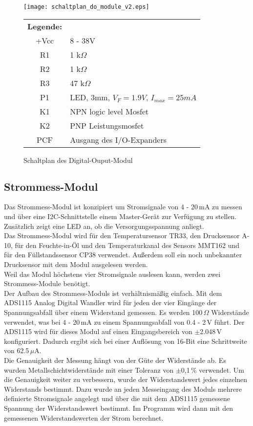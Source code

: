 \begin{figure}[h]
\centering
\texttt{[image: schaltplan\_do\_module\_v2.eps]}
\caption{Schaltplan des Digital-Ouput-Modul}
\vspace{12pt}
\begin{tabular}{c l}
	\textbf{Legende:}\\
	+Vcc & 8 - 38V\\
	R1 & 1 k\(\Omega\)\\
	R2 & 1 k\(\Omega\)\\
	R3 & 47 k\(\Omega\)\\
	P1 & LED, 3mm, \(V_F = 1.9 V\), \(I_{max} = 25 mA\)\\
	K1 & NPN logic level Mosfet\\
	K2 & PNP Leistungsmosfet\\
	PCF & Ausgang des I/O-Expanders\\
\end{tabular}
\end{figure}

\subsection{Strommess-Modul}
Das Strommess-Modul ist konzipiert um Stromsignale von 4 - 20\,mA zu messen und über eine I2C-Schnittstelle einem Master-Gerät zur Verfügung zu stellen. Zusätzlich zeigt eine LED an, ob die Versorgungsspannung anliegt.
\\
Das Strommess-Modul wird für den Temperatursensor TR33, den Drucksensor A-10, für den Feuchte-in-Öl und den Temperaturkanal des Sensors MMT162 und für den Füllstandssensor CP38 verwendet. Außerdem soll ein noch unbekannter Drucksensor mit dem Modul ausgelesen werden.
\\
Weil das Modul höchstens vier Stromsignale auslesen kann, werden zwei Strommess-Module benötigt.
\\
Der Aufbau des Strommess-Moduls ist verhältnismäßig einfach. Mit dem ADS1115 Analog Digital Wandler wird für jeden der vier Eingänge der Spannungsabfall über einem Widerstand gemessen. Es werden 100\,\(\Omega\) Widerstände verwendet, was bei 4 - 20\,mA zu einem Spannungsabfall von 0.4 - 2\,V führt.
Der ADS1115 wird für dieses Modul auf einen Eingangsbereich von \(\pm\)2.048\,V konfiguriert. Dadurch ergibt sich bei einer Auflösung von 16-Bit eine Schrittweite von 62.5\,\(\mu\)A.
\cite{ads1115_datasheet}
\\
Die Genauigkeit der Messung hängt von der Güte der Widerstände ab. Es wurden Metallschichtwiderstände mit einer Toleranz von \(\pm\)0,1\,\% verwendet. Um die Genauigkeit weiter zu verbessern, wurde der Widerstandswert jedes einzelnen Widerstands bestimmt. Dazu wurde an jeden Messeingang des Moduls mehrere definierte Stromsignale angelegt und über die mit dem ADS1115 gemessene Spannung der Widerstandswert bestimmt. Im Programm wird dann mit den gemessenen Widerstandswerten der Strom berechnet.

